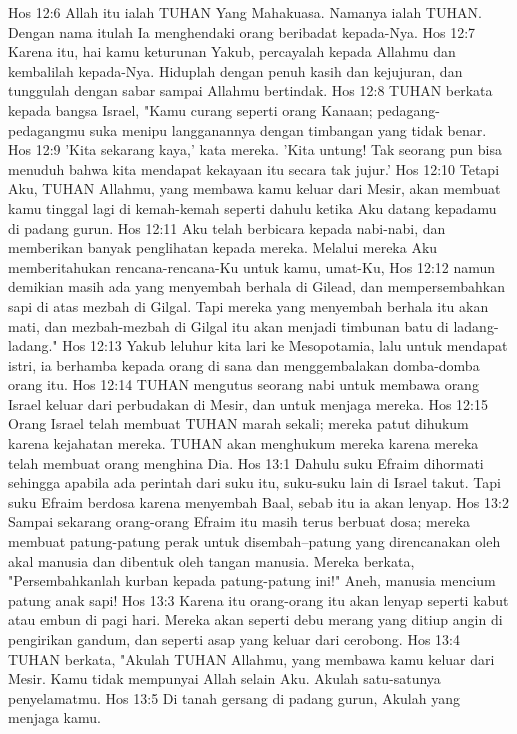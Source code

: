 Hos 12:6  Allah itu ialah TUHAN Yang Mahakuasa. Namanya ialah TUHAN. Dengan nama itulah Ia menghendaki orang beribadat kepada-Nya.
Hos 12:7  Karena itu, hai kamu keturunan Yakub, percayalah kepada Allahmu dan kembalilah kepada-Nya. Hiduplah dengan penuh kasih dan kejujuran, dan tunggulah dengan sabar sampai Allahmu bertindak.
Hos 12:8  TUHAN berkata kepada bangsa Israel, "Kamu curang seperti orang Kanaan; pedagang-pedagangmu suka menipu langganannya dengan timbangan yang tidak benar.
Hos 12:9  'Kita sekarang kaya,' kata mereka. 'Kita untung! Tak seorang pun bisa menuduh bahwa kita mendapat kekayaan itu secara tak jujur.'
Hos 12:10  Tetapi Aku, TUHAN Allahmu, yang membawa kamu keluar dari Mesir, akan membuat kamu tinggal lagi di kemah-kemah seperti dahulu ketika Aku datang kepadamu di padang gurun.
Hos 12:11  Aku telah berbicara kepada nabi-nabi, dan memberikan banyak penglihatan kepada mereka. Melalui mereka Aku memberitahukan rencana-rencana-Ku untuk kamu, umat-Ku,
Hos 12:12  namun demikian masih ada yang menyembah berhala di Gilead, dan mempersembahkan sapi di atas mezbah di Gilgal. Tapi mereka yang menyembah berhala itu akan mati, dan mezbah-mezbah di Gilgal itu akan menjadi timbunan batu di ladang-ladang."
Hos 12:13  Yakub leluhur kita lari ke Mesopotamia, lalu untuk mendapat istri, ia berhamba kepada orang di sana dan menggembalakan domba-domba orang itu.
Hos 12:14  TUHAN mengutus seorang nabi untuk membawa orang Israel keluar dari perbudakan di Mesir, dan untuk menjaga mereka.
Hos 12:15  Orang Israel telah membuat TUHAN marah sekali; mereka patut dihukum karena kejahatan mereka. TUHAN akan menghukum mereka karena mereka telah membuat orang menghina Dia.
Hos 13:1  Dahulu suku Efraim dihormati sehingga apabila ada perintah dari suku itu, suku-suku lain di Israel takut. Tapi suku Efraim berdosa karena menyembah Baal, sebab itu ia akan lenyap.
Hos 13:2  Sampai sekarang orang-orang Efraim itu masih terus berbuat dosa; mereka membuat patung-patung perak untuk disembah--patung yang direncanakan oleh akal manusia dan dibentuk oleh tangan manusia. Mereka berkata, "Persembahkanlah kurban kepada patung-patung ini!" Aneh, manusia mencium patung anak sapi!
Hos 13:3  Karena itu orang-orang itu akan lenyap seperti kabut atau embun di pagi hari. Mereka akan seperti debu merang yang ditiup angin di pengirikan gandum, dan seperti asap yang keluar dari cerobong.
Hos 13:4  TUHAN berkata, "Akulah TUHAN Allahmu, yang membawa kamu keluar dari Mesir. Kamu tidak mempunyai Allah selain Aku. Akulah satu-satunya penyelamatmu.
Hos 13:5  Di tanah gersang di padang gurun, Akulah yang menjaga kamu.
